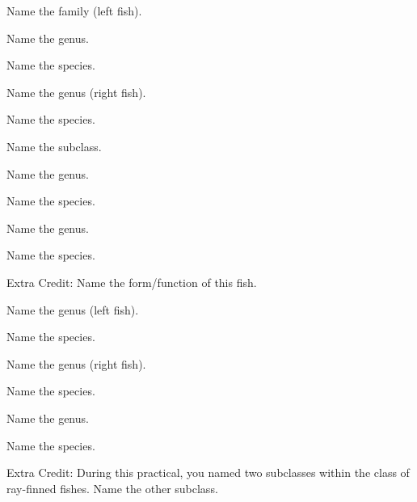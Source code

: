 \documentclass{exam}
\begin{document}
\begin{questions}
{\question Name the family (left fish).
\vspace{0.5\baselineskip}

\question Name the genus.
\vspace{0.5\baselineskip}

\question Name the species.
\vspace{2\baselineskip}


\question Name the genus (right fish).
\vspace{0.5\baselineskip}

\question Name the species.
\vspace{2\baselineskip}
%

\question Name the subclass.
\vspace{0.5\baselineskip}

\question Name the genus.
\vspace{0.5\baselineskip}

\question Name the species.
\vspace{2\baselineskip}
%

\question Name the genus.
\vspace{0.5\baselineskip}

\question Name the species.
\vspace{0.5\baselineskip}

Extra Credit: Name the form/function of this fish.
\vspace{2\baselineskip}
%


\question Name the genus (left fish).
\vspace{0.5\baselineskip}

\question Name the species.
\vspace{2\baselineskip}
%

\question Name the genus (right fish).
\vspace{0.5\baselineskip}

\question Name the species.
\vspace{2\baselineskip}
%

\question Name the genus.
\vspace{0.5\baselineskip}

\question Name the species.
\vspace{0.5\baselineskip}

Extra Credit: During this practical, you named two subclasses within the class of ray-finned fishes. Name the other subclass. 
}%
\end{questions}
\end{document}
